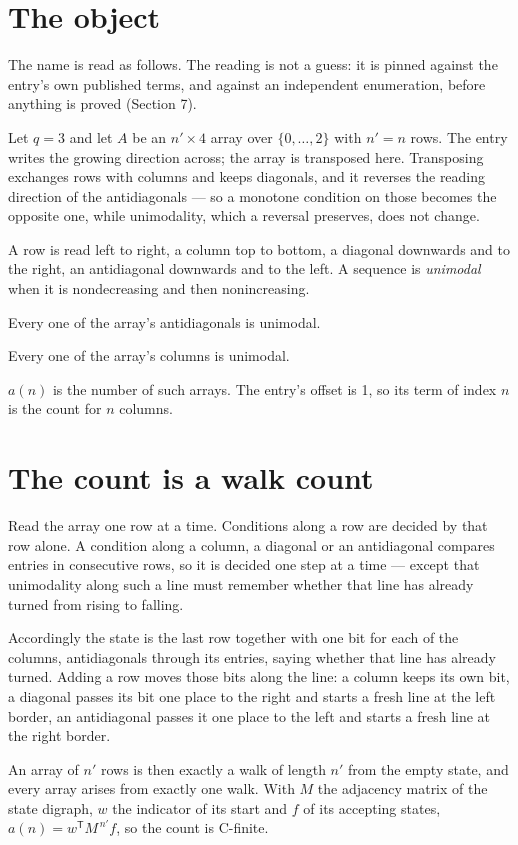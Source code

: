 \documentclass[11pt]{article}
\theoremstyle{definition}
\begin{document}
\section{The object}

The name is read as follows. The reading is not a guess: it is pinned against the entry's own published terms, and against an independent enumeration, before anything is proved (Section 7).

Let $q = 3$ and let $A$ be an $n' \times 4$ array over $\{0,\dots,2\}$ with $n' = n$ rows. The entry writes the growing direction across; the array is transposed here. Transposing exchanges rows with columns and keeps diagonals, and it reverses the reading direction of the antidiagonals --- so a monotone condition on those becomes the opposite one, while unimodality, which a reversal preserves, does not change.

A row is read left to right, a column top to bottom, a diagonal downwards and to the right, an antidiagonal downwards and to the left. A sequence is {\itshape unimodal} when it is nondecreasing and then nonincreasing.

Every one of the array's antidiagonals is unimodal.

Every one of the array's columns is unimodal.

$a(n)$ is the number of such arrays. The entry's offset is 1, so its term of index $n$ is the count for $n$ columns.

\section{The count is a walk count}

Read the array one row at a time. Conditions along a row are decided by that row alone. A condition along a column, a diagonal or an antidiagonal compares entries in consecutive rows, so it is decided one step at a time --- except that unimodality along such a line must remember whether that line has already turned from rising to falling.

Accordingly the state is the last row together with one bit for each of the columns, antidiagonals through its entries, saying whether that line has already turned. Adding a row moves those bits along the line: a column keeps its own bit, a diagonal passes its bit one place to the right and starts a fresh line at the left border, an antidiagonal passes it one place to the left and starts a fresh line at the right border.

An array of $n'$ rows is then exactly a walk of length $n'$ from the empty state, and every array arises from exactly one walk. With $M$ the adjacency matrix of the state digraph, $w$ the indicator of its start and $f$ of its accepting states, $a(n) = w^{\mathsf T}M^{\,n'}f$, so the count is C-finite.
\end{document}
